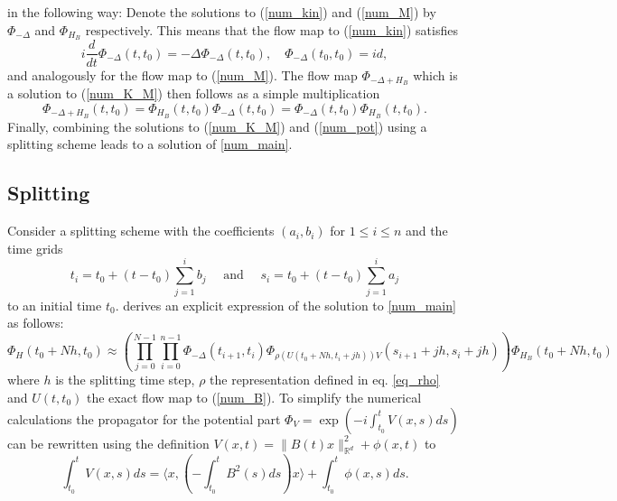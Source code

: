\documentclass{article}
\begin{document}
in the following way: Denote the solutions to (\ref{num_kin}) and (\ref{num_M}) by $\Phi_{-\Delta}$ and $\Phi_{H_B}$ respectively. This means that the flow map to (\ref{num_kin}) satisfies
\begin{equation}
  i \frac{d}{dt}\Phi_{-\Delta}(t, t_0) = -\Delta \Phi_{-\Delta}(t, t_0), \quad \Phi_{-\Delta}(t_0, t_0) = id,
\end{equation}
and analogously for the flow map to (\ref{num_M}). The flow map $\Phi_{-\Delta + H_B}$ which is a solution to (\ref{num_K_M}) then follows as a simple multiplication
\begin{equation}
  \Phi_{-\Delta + H_B}(t, t_0) = \Phi_{H_B}(t, t_0)\Phi_{-\Delta}(t, t_0) = \Phi_{-\Delta}(t, t_0)\Phi_{H_B}(t, t_0).
\end{equation}
Finally, combining the solutions to (\ref{num_K_M}) and (\ref{num_pot}) using a splitting scheme leads to a solution of \ref{num_main}.

\subsection{Splitting}
Consider a splitting scheme with the coefficients $(a_i, b_i)$ for $1 \leq i \leq n$ and the time grids
\begin{equation}
  t_{i}=t_{0}+\left(t-t_{0}\right) \sum_{j=1}^{i} b_{j} \quad \text { and } \quad s_{i}=t_{0}+\left(t-t_{0}\right) \sum_{j=1}^{i} a_{j}
\end{equation}
to an initial time $t_0$. \cite{paper_orvg} derives an explicit expression of the solution to \ref{num_main} as follows:
\begin{equation} \label{eq:timesteps}
  \Phi_{H}\left(t_{0}+N h, t_{0}\right) \approx\left(\prod_{j=0}^{N-1} \prod_{i=0}^{n-1} \Phi_{-\Delta}\left(t_{i+1}, t_{i}\right) \Phi_{\rho\left(U\left(t_{0}+N h, t_{i}+j h\right)\right) V}\left(s_{i+1}+j h, s_{i}+j h\right)\right) \Phi_{H_{B}}\left(t_{0}+N h, t_{0}\right)
\end{equation}
where $h$ is the splitting time step, $\rho$ the representation defined in eq. \ref{eq_rho} and $U(t, t_0)$ the exact flow map to (\ref{num_B}). \newline
To simplify the numerical calculations the propagator for the potential part $\Phi_{V} = \exp(-i \int_{t_0}^t V(x, s)ds)$ can be rewritten using the definition $V(x, t) = \lVert{B(t)x}\rVert_{\mathbb{R}^d}^2 + \phi(x,t)$ to
\begin{equation} \label{eq:rotinv}
  \int_{t_0}^t V(x, s) ds = \langle x, \left( -\int _{t_0}^t B^2(s)ds\right)x \rangle + \int _{t_0}^t \phi(x, s)ds.
\end{equation}
\end{document}
